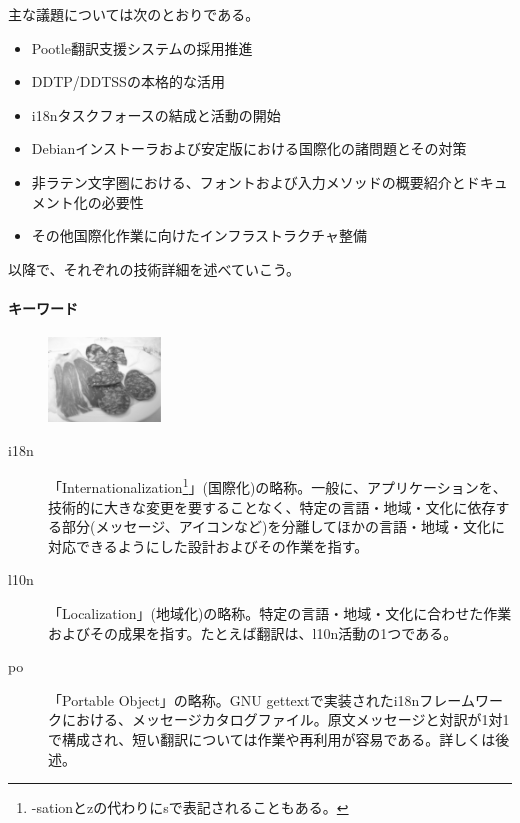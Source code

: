 \documentclass[mingoth,a4paper]{jsarticle}
\begin{document}
主な議題については次のとおりである。

\begin{itemize}
\item Pootle翻訳支援システムの採用推進
\item DDTP/DDTSSの本格的な活用
\item i18nタスクフォースの結成と活動の開始
\item Debianインストーラおよび安定版における国際化の諸問題とその対策
\item 非ラテン文字圏における、フォントおよび入力メソッドの概要紹介とドキュメント化の必要性
\item その他国際化作業に向けたインフラストラクチャ整備
\end{itemize}

以降で、それぞれの技術詳細を述べていこう。

\begin{screen}
  \paragraph*{キーワード}
  \begin{figure}\includegraphics[width=3cm]{image200610/jamon.eps}\end{figure}
  \begin{description}
  \item[i18n] 「Internationalization\footnote{-sationとzの代わりにsで表記されることもある。}」(国際化)の略称。一般に、アプリケーションを、技術的に大きな変更を要することなく、特定の言語・地域・文化に依存する部分(メッセージ、アイコンなど)を分離してほかの言語・地域・文化に対応できるようにした設計およびその作業を指す。
  \item[l10n] 「Localization」(地域化)の略称。特定の言語・地域・文化に合わせた作業およびその成果を指す。たとえば翻訳は、l10n活動の1つである。
  \item[po] 「Portable Object」の略称。GNU gettextで実装されたi18nフレームワークにおける、メッセージカタログファイル。原文メッセージと対訳が1対1で構成され、短い翻訳については作業や再利用が容易である。詳しくは後述。
  \end{description}
\end{screen}
\end{document}

